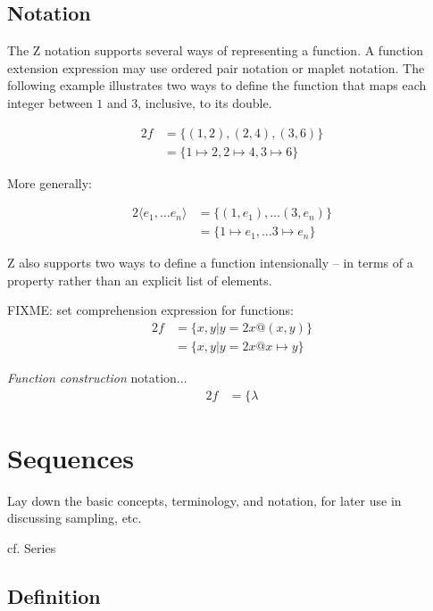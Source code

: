 \subsection{Notation}

The Z notation supports several ways of representing a function.  A
function extension expression may use ordered pair notation or maplet
notation.  The following example illustrates two ways to define the
function that maps each integer between $1$ and $3$, inclusive, to its
double.

\begin{alignat}{2}
  f &= \{(1,2),(2,4),(3,6)\} \\
  &= \{1\mapsto 2, 2\mapsto 4, 3\mapsto 6\}
\end{alignat}

\noindent More generally:

\begin{alignat}{2}
  \langle e_1,\ldots e_n\rangle &= \{(1,e_1),\ldots (3,e_n)\} \\
  &= \{1\mapsto e_1,\ldots 3\mapsto e_n\}
\end{alignat}

Z also supports two ways to define a function intensionally -- in
terms of a property rather than an explicit list of elements.

\begin{remark}
FIXME: set comprehension expression for functions:
\begin{alignat}{2}
  f &= \{x,y | y=2x @ (x,y)\} \\
  &= \{x,y | y=2x @ x\mapsto y\}
\end{alignat}
\end{remark}

\textit{Function construction} notation...
\begin{alignat}{2}
  f &= \{\lambda
\end{alignat}


\section{Sequences}
\label{subs:sequences}

\begin{remark}
  Lay down the basic concepts, terminology, and notation, for later
  use in discussing sampling, etc.

  cf. Series
\end{remark}

\subsection{Definition}

